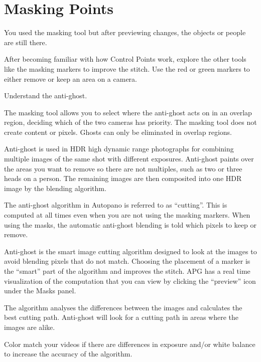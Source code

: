 \chapter{Masking Points}
\pagecolor{white}
\label{chap:41}
\begin{fullwidth}


\problem

{\large You used the masking tool but after previewing changes, the objects or people are still there. \par}

After becoming familiar with how Control Points work, explore the other tools like the masking markers to improve the stitch. Use the red or green markers to either remove or keep an area on a camera. 


\solutions

{\large Understand the anti-ghost. \par}

The masking tool allows you to select where the anti-ghost acts on in an overlap region, deciding which of the two cameras has priority. The masking tool does not create content or pixels. Ghosts can only be eliminated in overlap regions.


Anti-ghost is used in HDR high dynamic range photographs for combining multiple images of the same shot with different exposures. Anti-ghost paints over the areas you want to remove so there are not multiples, such as two or three heads on a person. The remaining images are then composited into one HDR image by the blending algorithm.

The anti-ghost algorithm in Autopano is referred to as “cutting”. This is computed at all times even when you are not using the masking markers. When using the masks, the automatic anti-ghost blending is told which pixels to keep or remove. 

Anti-ghost is the smart image cutting algorithm designed to look at the images to avoid blending pixels that do not match. Choosing the placement of a marker is the “smart” part of the algorithm and improves the stitch. APG has a real time visualization of the computation that you can view by clicking the “preview” icon under the Masks panel.

The algorithm analyses the differences between the images and calculates the best cutting path. Anti-ghost will look for a cutting path in areas where the images are alike. 

\tip Color match your videos if there are differences in exposure and/or white balance to increase the accuracy of the algorithm.


\end{fullwidth}
